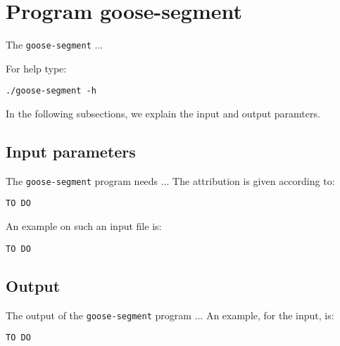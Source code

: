 \section{Program goose-segment}
The \texttt{goose-segment} ...

For help type:
\begin{lstlisting}
./goose-segment -h
\end{lstlisting}
In the following subsections, we explain the input and output paramters.

\subsection{Input parameters}

The \texttt{goose-segment} program needs ...
The attribution is given according to:
\begin{lstlisting}
TO DO
\end{lstlisting}

An example on such an input file is:
\begin{lstlisting}
TO DO
\end{lstlisting}

\subsection{Output}
The output of the \texttt{goose-segment} program ...
An example, for the input, is:
\begin{lstlisting}
TO DO
\end{lstlisting}